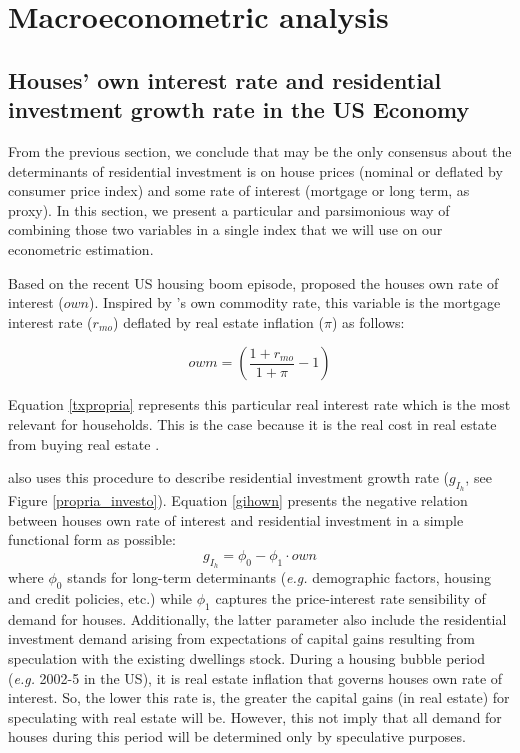 \documentclass[12pt, a4paper]{article}
\begin{document}


\section{Macroeconometric analysis}
\label{sec:orgbd64336}
\label{sec:VECM}
\subsection{Houses' own interest rate and residential investment growth rate in the US Economy}
\label{sec:orga96f218}
\label{sc:own}

From the previous section, we conclude that may be the only consensus about the determinants of residential investment is on house prices (nominal or deflated by consumer price index) and some rate of interest (mortgage or long term, as proxy).
In this section, we present a particular and parsimonious way of combining those two variables  in a single index that we will use on our econometric estimation.

Based on the recent US housing boom episode, \textcite{teixeira_crescimento_2015}  proposed the houses own rate of interest (\(own\)).
Inspired by \citeauthor*{sraffaDrHayekMoney1932}'s \citeyear{sraffaDrHayekMoney1932} own commodity rate, this variable is the mortgage interest rate (\(r_{mo}\)) deflated by real estate inflation (\(\pi\)) as follows:
\begin{latex}
\begin{equation}
\label{txpropria}
owm =  \left(\frac{1+r_{mo}}{1+\pi} - 1\right)
\end{equation}
\end{latex}
Equation \ref{txpropria} represents this particular real interest rate which is the most relevant for households.
This is the case because it is the real cost in real estate from buying real estate  \cite[p.~53]{teixeira_crescimento_2015}.

\textcite{teixeira_crescimento_2015} also uses this procedure to describe residential investment growth rate (\(g_{I_{h}}\), see Figure \ref{propria_investo}).
Equation \ref{gihown} presents the negative relation between houses own rate of interest and residential investment in a simple functional form as possible:
\begin{equation}
\label{gihown}
g_{I_h} = \phi_0 - \phi_1\cdot own
\end{equation}
where \(\phi_0\) stands for long-term determinants (\emph{e.g.} demographic factors, housing and credit policies, etc.) while \(\phi_1\) captures the price-interest rate sensibility of demand for houses.
Additionally, the latter parameter also include the residential investment demand arising from expectations of capital gains resulting from speculation with the existing dwellings stock.
During a housing bubble period (\emph{e.g.} 2002-5 in the US), it is real estate inflation that governs houses own rate of interest.
So, the lower this rate is, the greater the capital gains (in real estate) for speculating with real estate will be.
However, this not imply that all demand for houses during this period will be determined only by speculative purposes.
\end{document}
